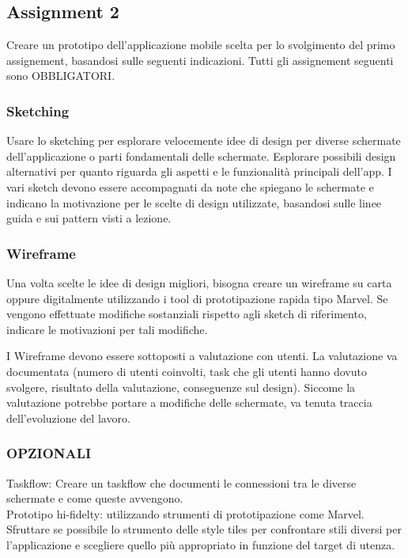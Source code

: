 \newpage

\subsection{Assignment 2}
Creare un prototipo dell'applicazione mobile scelta per lo svolgimento del primo assignement, basandosi sulle seguenti indicazioni.
Tutti gli assignement seguenti sono OBBLIGATORI.

\subsubsection{Sketching}
Usare lo sketching per esplorare velocemente idee di design per diverse schermate dell'applicazione o parti fondamentali delle schermate.
Esplorare possibili design alternativi per quanto riguarda gli aspetti e le funzionalità principali dell'app.
I vari sketch devono essere accompagnati da note che spiegano le schermate e indicano la motivazione per le scelte di design utilizzate, basandosi sulle linee guida e sui pattern visti a lezione.

\subsubsection{Wireframe}
Una volta scelte le idee di design migliori, bisogna creare un wireframe su carta oppure digitalmente utilizzando i tool di prototipazione rapida tipo Marvel. Se vengono effettuate modifiche sostanziali rispetto agli sketch di riferimento, indicare le motivazioni per tali modifiche.

I Wireframe devono essere sottoposti a valutazione con utenti.
La valutazione va documentata (numero di utenti coinvolti, task che gli utenti hanno dovuto svolgere, risultato della valutazione, conseguenze sul design). Siccome la valutazione potrebbe portare a modifiche delle schermate, va tenuta traccia dell'evoluzione del lavoro. 

\subsubsection{OPZIONALI}
Taskflow: Creare un taskflow che documenti le connessioni tra le diverse schermate e come queste avvengono.\\
Prototipo hi-fidelty: utilizzando strumenti di prototipazione come Marvel. Sfruttare se possibile lo strumento delle style tiles per confrontare stili diversi per l'applicazione e scegliere quello più appropriato in funzione del target di utenza.\\

\newpage